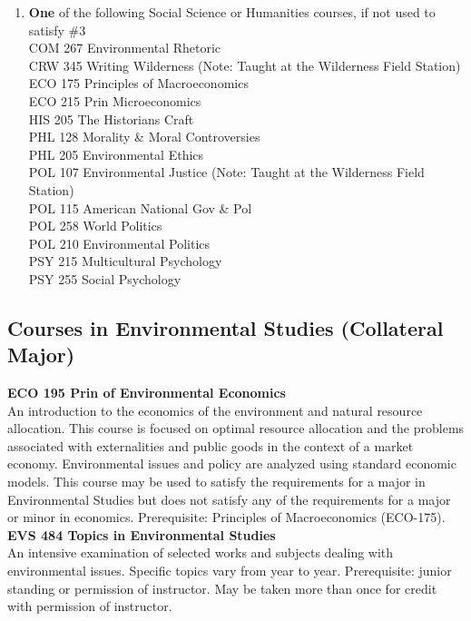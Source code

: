 \documentclass[
  letterpaper,
]{scrbook}
\begin{document}
\begin{enumerate}
  BIO 203 Northwoods Ecology (Note: Taught at the Wilderness Field
  Station)\\
  BIO 275 Aquatic Ecology (Note: Taught at the Wilderness Field
  Station)\\
  BIO 295/295L Spatial Ecology and Laboratory (WE)\\
  CHM 103/103L Selected Concepts in Chemistry and Laboratory \textbf{or}
  CHM 121/121L General Chemistry I and Laboratory\\
  PHY 161 Energy: Science and Technology\\
  PHY 311 Renewable Energy (WE)\\
\item
  \textbf{One} of the following Social Science or Humanities courses, if
  not used to satisfy \#3\\
  COM 267 Environmental Rhetoric\\
  CRW 345 Writing Wilderness (Note: Taught at the Wilderness Field
  Station)\\
  ECO 175 Principles of Macroeconomics\\
  ECO 215 Prin Microeconomics\\
  HIS 205 The Historians Craft\\
  PHL 128 Morality \& Moral Controversies\\
  PHL 205 Environmental Ethics\\
  POL 107 Environmental Justice (Note: Taught at the Wilderness Field
  Station)\\
  POL 115 American National Gov \& Pol\\
  POL 258 World Politics\\
  POL 210 Environmental Politics\\
  PSY 215 Multicultural Psychology\\
  PSY 255 Social Psychology
\end{enumerate}

\subsection{Courses in Environmental Studies (Collateral
Major)}\label{courses-in-environmental-studies-collateral-major}

\textbf{ECO 195 Prin of Environmental Economics}\\
An introduction to the economics of the environment and natural resource
allocation. This course is focused on optimal resource allocation and
the problems associated with externalities and public goods in the
context of a market economy. Environmental issues and policy are
analyzed using standard economic models. This course may be used to
satisfy the requirements for a major in Environmental Studies but does
not satisfy any of the requirements for a major or minor in economics.
Prerequisite: Principles of Macroeconomics (ECO-175).\\
\textbf{EVS 484 Topics in Environmental Studies}\\
An intensive examination of selected works and subjects dealing with
environmental issues. Specific topics vary from year to year.
Prerequisite: junior standing or permission of instructor. May be taken
more than once for credit with permission of instructor.
\end{document}
